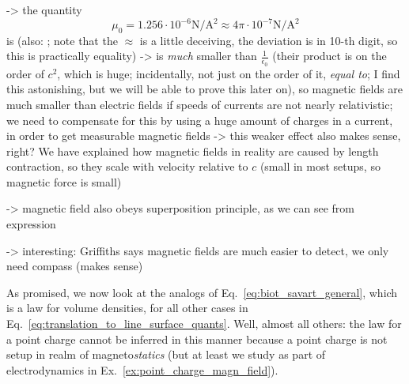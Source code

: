 \documentclass[../class_mech_main.tex]{subfiles}
\begin{document}
-> the quantity
\begin{equation}
    \mu_0
    = 1.256 \cdot 10^{-6} \unit{\newton \per \ampere \squared}
    \approx 4\pi \cdot 10^{-7} \unit{\newton \per \ampere \squared}
\end{equation}
is  (also: ; note that the $\approx$ is a little deceiving, the deviation is in 10-th digit, so this is practically equality) -> is \emph{much} smaller than $\frac{1}{\epsilon_0}$ (their product is on the order of $c^2$, which is huge; incidentally, not just on the order of it, \emph{equal to}; I find this astonishing, but we will be able to prove this later on), so magnetic fields are much smaller than electric fields if speeds of currents are not nearly relativistic; we need to compensate for this by using a huge amount of charges in a current, in order to get measurable magnetic fields
-> this weaker effect also makes sense, right? We have explained how magnetic fields in reality are caused by length contraction, so they scale with velocity relative to $c$ (small in most setups, so magnetic force is small)


-> magnetic field also obeys superposition principle, as we can see from expression





-> interesting: Griffiths says magnetic fields are much easier to detect, we only need compass (makes sense)



As promised, we now look at the analogs of Eq.~\eqref{eq:biot_savart_general}, which is a law for volume densities, for all other cases in Eq.~\eqref{eq:translation_to_line_surface_quants}. Well, almost all others: the law for a point charge cannot be inferred in this manner because a point charge is not setup in realm of magneto\emph{statics} (but at least we study as part of electrodynamics in Ex.~\ref{ex:point_charge_magn_field}).
\end{document}
